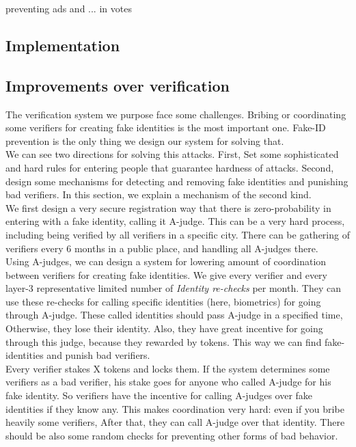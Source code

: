 \documentclass[conference]{IEEEtran}
\begin{document}
preventing ads and ... in votes\\

\subsection{Implementation}

\subsection{Improvements over verification}
The verification system we purpose face some challenges. Bribing or coordinating some verifiers for creating fake identities is the most important one. Fake-ID prevention is the only thing we design our system for solving that. \\
We can see two directions for solving this attacks. First, Set some sophisticated and hard rules for entering people that guarantee hardness of attacks. Second, design some mechanisms for detecting and removing fake identities and punishing bad verifiers. In this section, we explain a mechanism of the second kind. \\
We first design a very secure registration way that there is zero-probability in entering with a fake identity, calling it A-judge. This can be a very hard process, including being verified by all verifiers in a specific city. There can be gathering of verifiers every 6 months in a public place, and handling all A-judges there.
\\
Using A-judges, we can design a system for lowering amount of coordination between verifiers for creating fake identities. We give every verifier and every layer-3 representative limited number of \textit{Identity re-checks} per month. They can use these re-checks for calling specific identities (here, biometrics) for     going through A-judge. These called identities should pass A-judge in a specified time, Otherwise, they lose their identity. Also, they have great incentive for going through this judge, because they rewarded by tokens. This way we can find fake-identities and punish bad verifiers.
\\
Every verifier stakes X tokens and locks them. If the system determines some verifiers as a bad verifier, his stake goes for anyone who called A-judge for his fake identity. So verifiers have the incentive for calling A-judges over fake identities if they know any. This makes coordination very hard: even if you bribe heavily some verifiers, After that, they can call A-judge over that identity. There should be also some random checks for preventing other forms of bad behavior.
\end{document}
